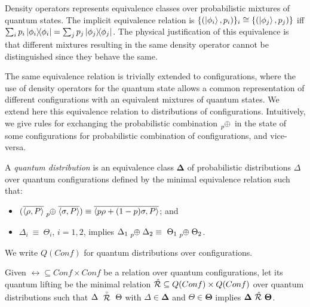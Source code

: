 Density operators represents equivalence classes over probabilistic mixtures of quantum states.
The implicit equivalence relation is $\{(\ket{\phi_i}, p_i)\}_i \cong \{(\ket{\phi_j}, p_j)\}$ iff $\sum_{i} p_i \ket{\phi_i}\!\!\bra{\phi_i} = \sum_{j} p_j \ket{\phi_j}\!\!\bra{\phi_j}$.
The physical justification of this equivalence is that different mixtures resulting in the same density operator cannot be distinguished since they behave the same.

The same equivalence relation is trivially extended to configurations, where the use of density operators for the quantum state allows a common representation of different configurations with an equivalent mixtures of quantum states. 
We extend here this equivalence relation to distributions of configurations.
Intuitively, we give rules for exchanging the probabilistic combination $\psum{p}$ in the state of some configurations for probabilistic combination of configurations, and vice-versa. 

\begin{definition}
	A \emph{quantum distribution} is an equivalence class $\mathbf{\Delta}$ of probabilistic distributions $\Delta$ over quantum configurations defined by the minimal equivalence relation such that:
	\begin{itemize}
		\item $(\overline{\confw{\rho, P}} \psum{p} \overline{\confw{\sigma, P}}) \equiv \overline{\confw{p \rho + (1-p)\sigma, P}}$; and
		\item $\Delta_i\ \equiv\ \Theta_i$, $i = 1, 2$, implies $\Delta_1 \psum{p} \Delta_2 \equiv\ \Theta_1 \psum{p} \Theta_2$.
	\end{itemize}
	We write $Q(Conf)$ for quantum distributions over configurations.
\end{definition}

\begin{definition}
	Given $\rel \subseteq Conf \times Conf$ be a relation over quantum configurations, let its quantum lifting be the minimal relation $\hat{\mathcal{R}} \subseteq Q(Conf) \times Q(Conf)$ over quantum distributions such that $\Delta\ \stackrel{\scriptscriptstyle \circ}{\mathcal{R}}\ \Theta$ with $\Delta \in \mathbf{\Delta}$ and $\Theta \in \mathbf{\Theta}$ implies $\mathbf{\Delta}\ \sqlift{\rel}\ \mathbf{\Theta}$.
\end{definition}

